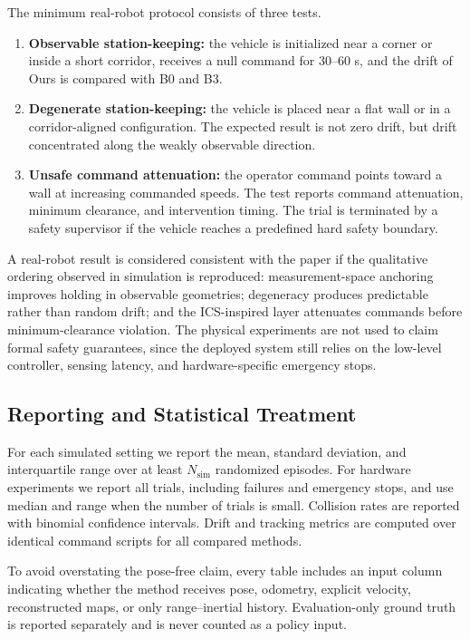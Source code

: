 \documentclass[11pt]{article}
\begin{document}
The minimum real-robot protocol consists of three tests.
\begin{enumerate}
    \item \textbf{Observable station-keeping:} the vehicle is initialized near a
    corner or inside a short corridor, receives a null command for $30$--$60$ s,
    and the drift of Ours is compared with B0 and B3.
    \item \textbf{Degenerate station-keeping:} the vehicle is placed near a flat
    wall or in a corridor-aligned configuration.  The expected result is not zero
    drift, but drift concentrated along the weakly observable direction.
    \item \textbf{Unsafe command attenuation:} the operator command points toward
    a wall at increasing commanded speeds.  The test reports command attenuation,
    minimum clearance, and intervention timing.  The trial is terminated by a
    safety supervisor if the vehicle reaches a predefined hard safety boundary.
\end{enumerate}

A real-robot result is considered consistent with the paper if the qualitative
ordering observed in simulation is reproduced: measurement-space anchoring
improves holding in observable geometries; degeneracy produces predictable
rather than random drift; and the ICS-inspired layer attenuates commands before
minimum-clearance violation.  The physical experiments are not used to claim
formal safety guarantees, since the deployed system still relies on the
low-level controller, sensing latency, and hardware-specific emergency stops.

\subsection{Reporting and Statistical Treatment}
\label{sec:exp_reporting}

For each simulated setting we report the mean, standard deviation, and
interquartile range over at least $N_{\mathrm{sim}}$ randomized episodes.  For
hardware experiments we report all trials, including failures and emergency
stops, and use median and range when the number of trials is small.  Collision
rates are reported with binomial confidence intervals.  Drift and tracking
metrics are computed over identical command scripts for all compared methods.

To avoid overstating the pose-free claim, every table includes an input column
indicating whether the method receives pose, odometry, explicit velocity,
reconstructed maps, or only range--inertial history.  Evaluation-only ground
truth is reported separately and is never counted as a policy input.
\end{document}
